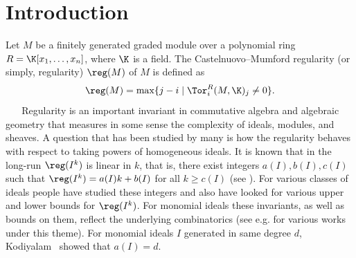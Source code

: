 \section{Introduction}
Let $M$ be a finitely generated graded module over a polynomial ring $R = \K[x_1,\ldots,x_n]$, where
$\K$ is a field. The Castelnuovo--Mumford regularity (or simply, regularity) $\reg(M)$ of $M$
is defined as
$$
 \reg(M)=\max \{j-i \mid \Tor_i^R(M, \K)_j \neq 0\}.
$$
 $\text{  }$ $\text{  }$Regularity  is an important invariant in commutative algebra and algebraic geometry that measures in some sense the complexity of ideals, modules, and sheaves. A question that has been studied by many is how the regularity behaves with respect to taking powers of homogeneous ideals. It is known that in the long-run $\reg(I^k)$ is linear in $k$, that is, there exist integers $a(I), b(I), c(I)$ such that $\reg(I^k) = a(I)k + b(I)$ for all $k\geq c(I)$ (see \cite{CHT,vijay}). For various classes of ideals people have studied these integers and also have looked for various upper and lower bounds for $\reg(I^k)$.
 For monomial ideals these invariants, as well as bounds on them, reflect the underlying combinatorics (see e.g. \cite{BBH17,ha_adam2,Herzog'sBook,ms2005,MorVill,Nevo} for various works under this theme).
 For monomial ideals $I$ generated in same degree $d$, Kodiyalam~\cite{vijay} showed that $a(I)=d$.

